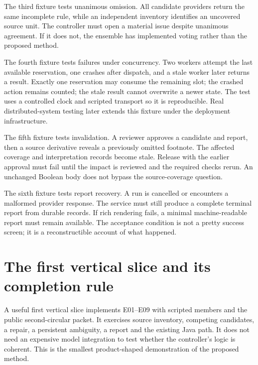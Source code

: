 The third fixture tests unanimous omission. All candidate providers return the
same incomplete rule, while an independent inventory identifies an uncovered
source unit. The controller must open a material issue despite unanimous agreement.
If it does not, the ensemble has implemented voting rather than the proposed
method.


The fourth fixture tests failures under concurrency. Two workers attempt the last
available reservation, one crashes after dispatch, and a stale worker later
returns a result. Exactly one reservation may consume the remaining slot; the
crashed action remains counted; the stale result cannot overwrite a newer state.
The test uses a controlled clock and scripted transport so it is reproducible.
Real distributed-system testing later extends this fixture under the deployment
infrastructure.

The fifth fixture tests invalidation. A reviewer approves a candidate and report,
then a source derivative reveals a previously omitted footnote. The affected
coverage and interpretation records become stale. Release with the earlier
approval must fail until the impact is reviewed and the required checks rerun.
An unchanged Boolean body does not bypass the source-coverage question.

The sixth fixture tests report recovery. A run is cancelled or encounters a
malformed provider response. The service must still produce a complete terminal
report from durable records. If rich rendering fails, a minimal machine-readable
report must remain available. The acceptance condition is not a pretty success
screen; it is a reconstructible account of what happened.

\section{The first vertical slice and its completion rule}
\label{merge:M08:13}


A useful first vertical slice implements E01--E09 with scripted members and the
public second-circular packet. It exercises source inventory, competing candidates,
a repair, a persistent ambiguity, a report and the existing Java path. It does
not need an expensive model integration to test whether the controller's logic
is coherent. This is the smallest product-shaped demonstration of the proposed
method.


